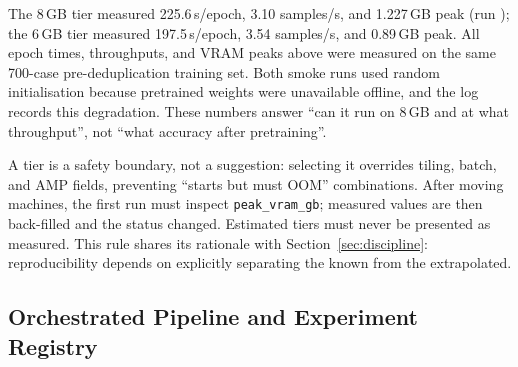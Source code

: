 \begin{table}[t]
\centering
\caption{VRAM tier recipes. The 6\,GB and 8\,GB tiers are measured on the pre-deduplication 700-case training set; 12\,GB and above are extrapolated estimates and must not be cited as measurements.}
\label{tab:vram}
\small
{}
\end{table}

The 8\,GB tier measured 225.6\,s/epoch, 3.10 samples/s, and 1.227\,GB peak (run ); the 6\,GB tier measured 197.5\,s/epoch, 3.54 samples/s, and 0.89\,GB peak. All epoch times, throughputs, and VRAM peaks above were measured on the same 700-case pre-deduplication training set. Both smoke runs used random initialisation because pretrained weights were unavailable offline, and the log records this degradation. These numbers answer ``can it run on 8\,GB and at what throughput'', not ``what accuracy after pretraining''.



A tier is a safety boundary, not a suggestion: selecting it overrides tiling, batch, and AMP fields, preventing ``starts but must OOM'' combinations. After moving machines, the first run must inspect \texttt{peak\_vram\_gb}; measured values are then back-filled and the status changed. Estimated tiers must never be presented as measured. This rule shares its rationale with Section~\ref{sec:discipline}: reproducibility depends on explicitly separating the known from the extrapolated.

\subsection{Orchestrated Pipeline and Experiment Registry}\label{sec:pipeline}

